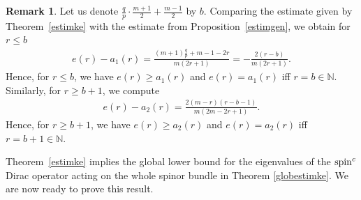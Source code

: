 \documentclass[pdftex]{sigma}
\numberwithin{equation}{section}
\theoremstyle{definition}
\newtheorem{Remark}[thm]{Remark}
\begin{document}
\begin{Remark}\label{comp} Let us denote $\frac{q}{p}\cdot\frac{m+1}{2}+\frac{m-1}{2}$  by $b$.
Comparing the estimate given by Theorem~\ref{estimke} with the estimate from Proposition~\ref{estimgen}, we obtain for $r\leq  b$
\begin{gather*}e(r)-a_1(r)=\frac{(m+1)\frac{q}{p}+m-1-2r}{m(2r+1)}=-\frac{2(r-b)}{m(2r+1)}.\end{gather*}
Hence, for $r \leq  b$, we have $e(r)\geq a_1(r)$ and $e(r)=a_1(r)$ if\/f $r=b\in\mathbb{N}$.
Similarly, for $r\geq b+1$, we compute
\begin{gather*}e(r)-a_2(r)=\frac{2(m-r)(r-b-1)}{m(2m-2r+1)}.\end{gather*}
Hence, for  $r\geq b+1$, we have $e(r)\geq a_2(r)$ and $e(r)=a_2(r)$ if\/f $r=b+1\in\mathbb{N}$.
\end{Remark}


Theorem~\ref{estimke} implies the global lower bound for the eigenvalues of the ${\mathop{\rm spin}^c}$ Dirac operator acting on the whole spinor bundle in Theorem \ref{globestimke}. We are now ready to prove this result.
\end{document}
